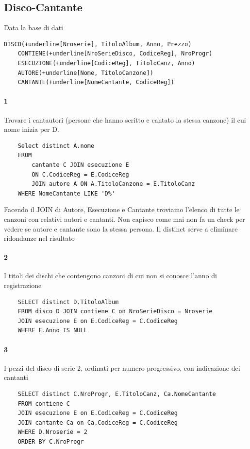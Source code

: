 \documentclass[12pt, a4paper, openany]{book}
\begin{document}
\subsection*{Disco-Cantante}
Data la base di dati
\begin{Verbatim}[commandchars=+\[\]]
    DISCO(+underline[Nroserie], TitoloAlbum, Anno, Prezzo)
    CONTIENE(+underline[NroSerieDisco, CodiceReg], NroProgr)
    ESECUZIONE(+underline[CodiceReg], TitoloCanz, Anno)
    AUTORE(+underline[Nome, TitoloCanzone])
    CANTANTE(+underline[NomeCantante, CodiceReg])
\end{Verbatim}

\paragraph*{1} Trovare i cantautori (persone che hanno scritto e cantato la stessa canzone) il cui nome inizia per D.
\begin{Verbatim}
    Select distinct A.nome
    FROM 
        cantante C JOIN esecuzione E
        ON C.CodiceReg = E.CodiceReg
        JOIN autore A ON A.TitoloCanzone = E.TitoloCanz 
    WHERE NomeCantante LIKE 'D%'
\end{Verbatim}
Facendo il JOIN di Autore, Esecuzione e Cantante troviamo l'elenco di tutte le canzoni con relativi autori e cantanti. Non capisco come mai non fa un check per vedere se autore e cantante sono la stessa persona.
Il distinct serve a eliminare ridondanze nel risultato

\paragraph*{2}I titoli dei dischi che contengono canzoni di cui non si conosce l'anno di registrazione


\begin{Verbatim}
    SELECT distinct D.TitoloAlbum
    FROM disco D JOIN contiene C on NroSerieDisco = Nroserie
    JOIN esecuzione E on E.CodiceReg = C.CodiceReg
    WHERE E.Anno IS NULL
\end{Verbatim}

\paragraph*{3} I pezzi del disco di serie 2, ordinati per numero progressivo, con indicazione dei cantanti

\begin{Verbatim}
    SELECT distinct C.NroProgr, E.TitoloCanz, Ca.NomeCantante
    FROM contiene C
    JOIN esecuzione E on E.CodiceReg = C.CodiceReg
    JOIN cantante Ca on Ca.CodiceReg = C.CodiceReg
    WHERE D.Nroserie = 2
    ORDER BY C.NroProgr
\end{Verbatim}
\end{document}
